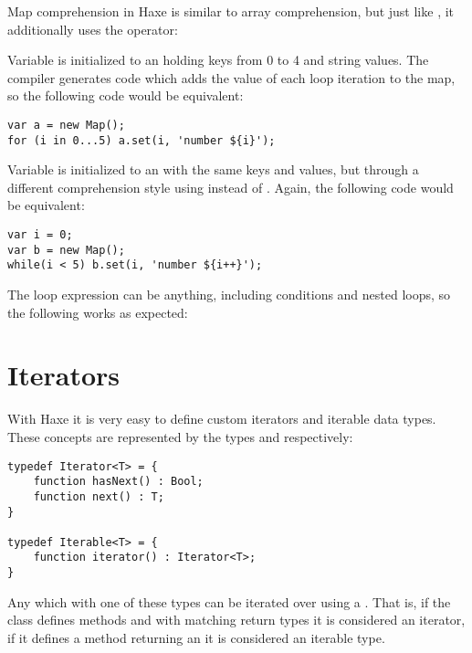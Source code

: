 Map comprehension in Haxe is similar to array comprehension, but just like , it additionally uses the \ic{=>} operator:


Variable  is initialized to an  holding keys from 0 to 4 and string values. The compiler generates code which adds the value of each loop iteration to the map, so the following code would be equivalent:

\begin{lstlisting}
var a = new Map();
for (i in 0...5) a.set(i, 'number ${i}');
\end{lstlisting}

Variable  is initialized to an  with the same keys and values, but through a different comprehension style using  instead of . Again, the following code would be equivalent:

\begin{lstlisting}
var i = 0;
var b = new Map();
while(i < 5) b.set(i, 'number ${i++}');
\end{lstlisting}

The loop expression can be anything, including conditions and nested loops, so the following works as expected:



\section{Iterators}
\label{lf-iterators}

With Haxe it is very easy to define custom iterators and iterable data types. These concepts are represented by the types  and  respectively:

\begin{lstlisting}
typedef Iterator<T> = {
	function hasNext() : Bool;
	function next() : T;
}

typedef Iterable<T> = {
	function iterator() : Iterator<T>;
}
\end{lstlisting}

Any  which  with one of these types can be iterated over using a . That is, if the class defines methods  and  with matching return types it is considered an iterator, if it defines a method  returning an  it is considered an iterable type.

